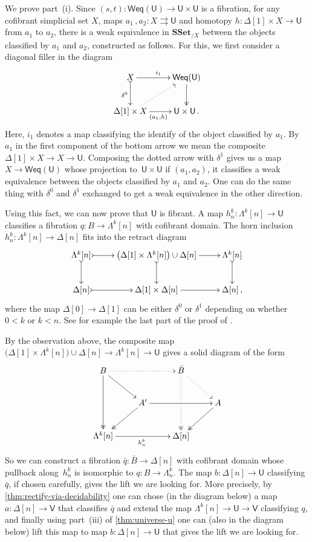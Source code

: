 \documentclass[reqno,10pt,a4paper,oneside]{amsart}
\makeatletter
\renewenvironment{proof}[1][\proofname] {\par\pushQED{\qed}\normalfont\topsep6\p@\@plus6\p@\relax\trivlist\item[\hskip\labelsep\bf#1\@addpunct{.}]\ignorespaces}{\popQED\endtrivlist\@endpefalse}
\numberwithin{equation}{section}
\theoremstyle{mythm}
\theoremstyle{mydef}
\theoremstyle{myrmk}
\newcommand{\ie}{\text{i.e.\ }}
\newcommand{\co}{\colon}
\newcommand{\SSet}{\mathbf{SSet}}
\newcommand{\U}{\mathsf{U}}
\newcommand{\V}{\mathsf{V}}
\makeatother
\begin{document}
\begin{proof} We prove part~(i). Since
$(s, t) \co \mathsf{Weq}(\U) \rightarrow \U \times \U$ is a fibration, for any cofibrant 
simplicial set $X$,  maps $a_1 \, , a_2 \co X \rightrightarrows \U$ and homotopy $h \co \Delta[1] \times X \rightarrow \U$ from $a_1$ to $a_2$, there is a weak equivalence in $\SSet_{/X}$ between the objects classified by $a_1$ and $a_2$, constructed as follows. For this, we first consider a diagonal filler in the
diagram
\[
\xymatrix{ X \ar[r]^{i_1} \ar@{>->}[d]_{\delta^0} & \mathsf{Weq}(\U) \ar@{->>}[d] \\
\Delta[1] \times X \ar[r]_{(a_1,h)} \ar@{.>}[ur] & \U \times \U \, .
}
\]
Here, $i_1$ denotes a map classifying the identify of the object classified by $a_1$. By $a_1$ in the first component of the bottom arrow we mean the composite $\Delta[1] \times X \rightarrow X \rightarrow \U$. Composing the dotted arrow with $\delta^1$ gives us a map $X \rightarrow  \mathsf{Weq}(\U)$ whose projection to~$\U \times \U$ if $(a_1,a_2)$, \ie it classifies a weak equivalence between the objects classified by $a_1$ and $a_2$. One can do the same thing with $\delta^0$ and $\delta^1$ exchanged to get a weak equivalence in the other direction.

Using this fact, we can now prove that $\U$ is fibrant. A map $h^k_n \co \Lambda^k[n] \rightarrow \U $ classifies a fibration $q \co B \rightarrow \Lambda^k[n]$ with cofibrant domain. The horn inclusion $h^k_n \co \Lambda^k [n] \rightarrow \Delta[n]$ fits into the retract diagram
\[
\xymatrix{\Lambda^k[n] \ar@{>->}[d] \ar@{>->}[r] & \big( \Delta[1] \times \Lambda^k[n] \big) \cup \Delta[n] \ar@{>->}[d] \ar[r] & \Lambda^k[n] \ar@{>->}[d]  \\
\Delta[n] \ar@{>->}[r] & \Delta[1] \times \Delta[n] \ar[r] & \Delta[n] \, ,
}\]
where the map $\Delta[0] \rightarrow \Delta[1]$ can be either $\delta^0$ or $\delta^1$ depending on whether $0<k$ or $k<n$. See for example the last part of the proof of \cite[Theorem 3.2.3]{joyal-tierney:simplicial-homotopy-theory}.

By the observation above, the composite map $\big( \Delta[1] \times \Lambda^k[n]  \big) \cup \Delta[n] \rightarrow \Lambda^k[n] \to \U$  gives a solid diagram of the form
\[ 
\xymatrix{
  B
  \ar@{.>}[rr]
  \ar[dr]
  \ar@{->>}[dd]
&&
  \bar{B}
  \ar@{.>}[dr]
  \ar@{.>>}[dd]|{\hole}
&\\&
  A'
  \ar[rr]
  \ar@{->>}[dl]
&&
  A
  \ar@{->>}[dl]
\\
  \Lambda^k[n]
  \ar[rr]_{h^k_n}
&&
  \Delta[n]
&
}
\] 
So we can construct a fibration  $\bar{q} \co \bar{B} \to \Delta[n]$ with cofibrant domain whose pullback 
along~$h^k_n$ is isomorphic to $q \co B \to \Lambda^k_n$. The map $b \co \Delta[n] \rightarrow \U$ classifying $\bar{q}$, if chosen carefully, gives the lift we are looking for. More precisely, by \cref{thm:rectify-via-decidability} one can chose (in the diagram below) a map $a:\Delta[n] \rightarrow \V$ that classifies $\bar{q}$ and extend the map $\Lambda^k[n] \to \U \to \V$ classifying $q$, and finally using part~(iii) of \cref{thm:universe-u} one can (also in the diagram below) lift this map to map $b:\Delta[n] \to \U$ that gives the lift we are looking for. 


\end{proof}
\end{document}
